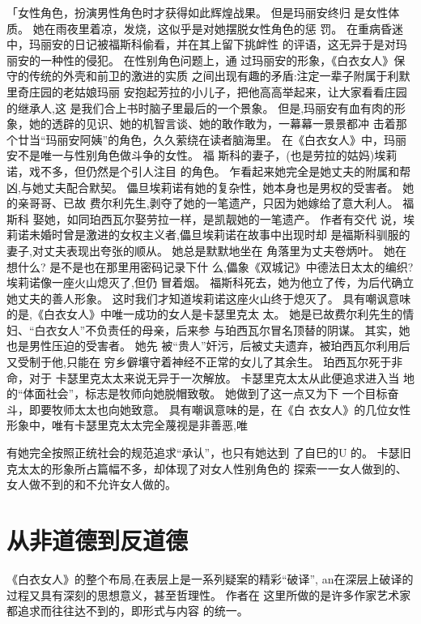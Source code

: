 \documentclass[a4paper]{article}
\begin{document}
「女性角色，扮演男性角色时才获得如此辉煌战果。 但是玛丽安终归
是女性体质。 她在雨夜里着凉，发烧，这似乎是对她摆脱女性角色的惩
罚。 在重病昏迷中，玛丽安的日记被福斯科偷看，并在其上留下挑衅性
的评语，这无异于是对玛丽安的一种性的侵犯。 在性别角色问题上，通
过玛丽安的形象，《白衣女人》保守的传统的外壳和前卫的激进的实质
之间出现有趣的矛盾:注定一辈子附属于利默里奇庄园的老姑娘玛丽
安抱起芳拉的小儿子，把他高高举起来，让大家看看庄园的继承人,这
是我们合上书时脑子里最后的一个景象。 但是,玛丽安有血有肉的形
象，她的透辟的见识、她的机智言谈、她的敢作敢为，一幕幕一景景都冲
击着那个廿当“玛丽安阿姨”的角色，久久萦绕在读者脑海里。
在《白衣女人》中，玛丽安不是唯一与性别角色做斗争的女性。 福
斯科的妻子，(也是劳拉的姑妈)埃莉诺，戏不多，但仍然是个引人注目
的角色。 乍看起来她完全是她丈夫的附属和帮凶,与她丈夫配合默契。
儡旦埃莉诺有她的复杂性，她本身也是男权的受害者。 她的亲哥哥、已故
费尔利先生,剥夺了她的一笔遗产，只因为她嫁给了意大利人。 福斯科
娶她，如同珀西瓦尔娶劳拉一样，是凯靓她的一笔遗产。 作者有交代
说，埃莉诺未婚时曾是激进的女权主义者,儡旦埃莉诺在故事中出现时却
是福斯科驯服的妻子,对丈夫表现出夸张的顺从。 她总是默默地坐在
角落里为丈夫卷炳叶。 她在想什么? 是不是也在那里用密码记录下什
么,儡象《双城记》中德法日太太的编织? 埃莉诺像一座火山熄灭了,但仍
冒着烟。 福斯科死去，她为他立了传，为后代确立她丈夫的善人形象。
这时我们才知道埃莉诺这座火山终于熄灭了。
具有嘲讽意味的是,《白衣女人》中唯一成功的女人是卡瑟里克太
太。 她是已故费尔利先生的情妇、“白衣女人”不负责任的母亲，后来参
与珀西瓦尔冒名顶替的阴谋。 其实，她也是男性压迫的受害者。 她先
被“贵人”奸污，后被丈夫遗弃，被珀西瓦尔利用后又受制于他,只能在
穷乡僻壤守着神经不正常的女儿了其余生。 珀西瓦尔死于非命，对于
卡瑟里克太太来说无异于一次解放。 卡瑟里克太太从此便追求进入当
地的“体面社会”，标志是牧师向她脱帽致敬。 她做到了这一点又为下
一个目标奋斗，即要牧师太太也向她致意。 具有嘲讽意味的是，在《白
衣女人》的几位女性形象中，唯有卡瑟里克太太完全蔑视是非善恶,唯

有她完全按照正统社会的规范追求“承认”，也只有她达到 了自巳的U
的。 卡瑟旧克太太的形象所占篇幅不多，却体现了对女人性别角色的
探索一一女人做到的、女人做不到的和不允许女人做的。

\section{从非道德到反道德}

《白衣女人》的整个布局,在表层上是一系列疑案的精彩“破译”,
an在深层上破译的过程又具有深刻的思想意义，甚至哲理性。 作者在
这里所做的是许多作家艺术家都追求而往往达不到的，即形式与内容
的统一。
\end{document}
